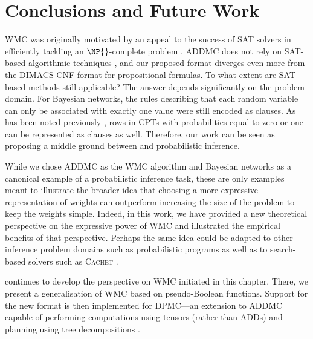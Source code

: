 \section{Conclusions and Future Work}

WMC was originally motivated by an appeal to the success of SAT solvers in
efficiently tackling an $\NP{}$-complete problem
\citep{DBLP:conf/aaai/SangBK05}. \textsc{ADDMC} does not rely on SAT-based
algorithmic techniques \citep{DBLP:conf/aaai/DudekPV20}, and our proposed format
diverges even more from the DIMACS CNF format for propositional formulas. To
what extent are SAT-based methods still applicable? The answer depends
significantly on the problem domain. For Bayesian networks, the rules describing
that each random variable can only be associated with exactly one value were
still encoded as clauses. As has been noted previously
\citep{DBLP:conf/sat/ChaviraD06}, rows in CPTs with probabilities equal to zero
or one can be represented as clauses as well. Therefore, our work can be seen as
proposing a middle ground between \mc{} and probabilistic inference.

While we chose \textsc{ADDMC} \citep{DBLP:conf/aaai/DudekPV20} as the WMC
algorithm and Bayesian networks as a canonical example of a probabilistic
inference task, these are only examples meant to illustrate the broader idea
that choosing a more expressive representation of weights can outperform
increasing the size of the problem to keep the weights simple. Indeed, in this
work, we have provided a new theoretical perspective on the expressive power of
WMC and illustrated the empirical benefits of that perspective. Perhaps the same
idea could be adapted to other inference problem domains such as probabilistic
programs
\citep{DBLP:journals/tplp/FierensBRSGTJR15,DBLP:journals/corr/abs-2005-09089} as
well as to search-based solvers such as \textsc{Cachet}
\citep{DBLP:conf/sat/SangBBKP04}.

 continues to develop the perspective on WMC initiated in
this chapter. There, we present a generalisation of WMC based on pseudo-Boolean
functions. Support for the new format is then implemented for \textsc{DPMC}---an
extension to \textsc{ADDMC} capable of performing computations using tensors
(rather than ADDs) and planning using tree decompositions
\citep{DBLP:conf/cp/DudekPV20}.
